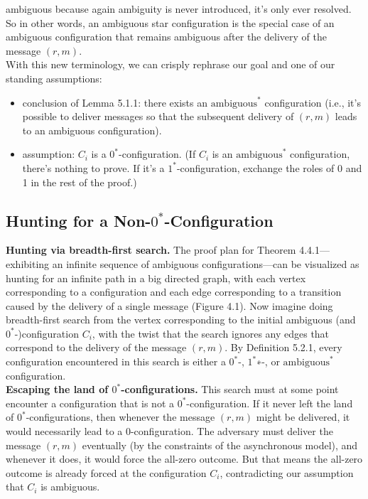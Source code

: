 ambiguous because again ambiguity is
never introduced, it's only ever
resolved.
So in other words, an ambiguous star
configuration is the special case of
an ambiguous configuration that remains
ambiguous after the delivery of the
message $(r,m)$.\\
With this new terminology, we can crisply rephrase our goal and one of our standing assumptions:
\begin{itemize}
    \item conclusion of Lemma 5.1.1: there exists an $\text{ambiguous}^*$ configuration (i.e., it’s possible to deliver messages so that the subsequent delivery of $(r, m)$ leads to an ambiguous configuration).
    \item assumption: $C_i$ is a $0^*$-configuration. (If $C_i$ is an $\text{ambiguous}^*$ configuration, there’s nothing to prove. If it’s a $1^*$-configuration, exchange the roles of 0 and 1 in the rest of the proof.)
\end{itemize}

\subsection{Hunting for a Non-$0^*$-Configuration}
\noindent
\textbf{Hunting via breadth-first search.} The proof plan for Theorem 4.4.1—exhibiting an infinite sequence of ambiguous configurations—can be visualized
as hunting for an infinite path in a big directed graph, with each vertex corresponding to a
configuration and each edge corresponding to a transition caused by the delivery of a single
message (Figure 4.1). Now imagine doing breadth-first search from the vertex corresponding
to the initial ambiguous (and $0^*$-)configuration $C_i$, with the twist that the search ignores
any edges that correspond to the delivery of the message $(r, m)$. By Definition 5.2.1, every
configuration encountered in this search is either a $0^*$-, $1^*$∗-, or $\text{ambiguous}^*$ configuration.\\

\noindent
\textbf{Escaping the land of $0^*$-configurations.} This search must at some point encounter a
configuration that is not a $0^*$-configuration. If it never left the land of $0^*$-configurations,
then whenever the message $(r, m)$ might be delivered, it would necessarily lead to a 0-configuration. The adversary must deliver the message $(r, m)$ eventually (by the constraints
of the asynchronous model), and whenever it does, it would force the all-zero outcome. But
that means the all-zero outcome is already forced at the configuration $C_i$, contradicting our
assumption that $C_i$ is ambiguous.\\

